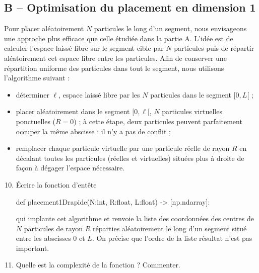 \documentclass[twoside,french,11pt]{VcCours}
\begin{document}
\subsection*{B -- Optimisation du placement en dimension 1}
Pour placer aléatoirement $N$ particules le long d'un segment, nous envisageons une approche plus efficace que
celle étudiée dans la partie A.
L'idée est de calculer l'espace laissé libre sur le segment cible par $N$ particules puis de répartir aléatoirement cet
espace libre entre les particules. Afin de conserver une répartition uniforme des particules dans tout le segment,
nous utilisons l'algorithme suivant :
\begin{itemize}
  \item[1.] déterminer $\ell$, espace laissé libre par les $N$ particules dans le segment $[0, L[$ ;
  \item[2.] placer aléatoirement dans le segment $[0, \ell[$, $N$ particules virtuelles ponctuelles ($R = 0$) ; à cette étape, deux
particules peuvent parfaitement occuper la même abscisse : il n'y a pas de conflit ;
  \item[3.] remplacer chaque particule virtuelle par une particule réelle de rayon $R$ en décalant toutes les particules
(réelles et virtuelles) situées plus à droite de façon à dégager l'espace nécessaire.
\end{itemize}
\begin{enumerate}\setcounter{enumi}{9}
  \item
Écrire la fonction d'entête
\begin{Python*}
def placement1Drapide(N:int, R:float, L:float) -> [np.ndarray]:
\end{Python*}
qui implante cet algorithme et renvoie la liste des coordonnées des centres de $N$ particules de rayon $R$ réparties
aléatoirement le long d'un segment situé entre les abscisses $0$ et $L$. On précise que l'ordre de la liste résultat
n'est pas important.
\item
Quelle est la complexité de la fonction  ? Commenter.
\end{enumerate}
\end{document}
